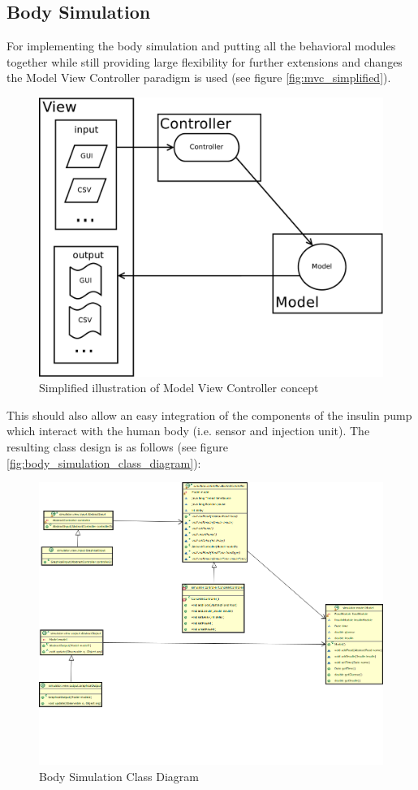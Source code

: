 \newpage
\subsection{Body Simulation}
\label{sec:body_simulation}
For implementing the body simulation and putting all the behavioral modules
together while still providing large flexibility for further extensions and
changes the Model View Controller paradigm is used (see figure
\vref{fig:mvc_simplified}). 

\begin{figure}[htb]
\centering
\includegraphics[scale=0.4]{images/mvc_simplified}
\caption{Simplified illustration of Model View Controller concept}
\label{fig:mvc_simplified}
\end{figure}

This should also allow an easy integration of the
components of the insulin pump which interact with the human body (i.e. sensor
and injection unit).
The resulting class design is as follows  (see figure
\vref{fig:body_simulation_class_diagram}): 

\begin{landscape}
\begin{figure}[htb]
\centering
\includegraphics[width=\textwidth]{images/body_simulation_classdiagram.png}
\caption{Body Simulation Class Diagram}
\label{fig:body_simulation_class_diagram}
\end{figure}
\end{landscape}
